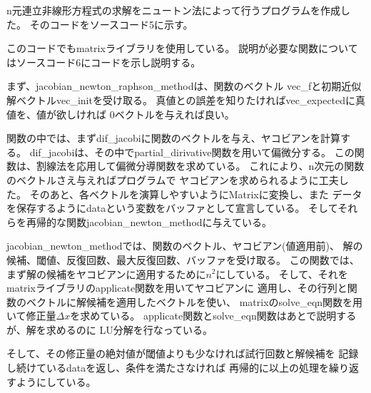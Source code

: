 \documentclass[uplatex, 11pt,a4j, titlepage]{jsarticle}
\begin{document}

\newpage



\subtitle{2019/*/*}


n元連立非線形方程式の求解をニュートン法によって行うプログラムを作成した。
そのコードをソースコード5に示す。

このコードでもmatrixライブラリを使用している。
説明が必要な関数についてはソースコード6にコードを示し説明する。

まず、jacobian\_newton\_raphson\_methodは、関数のベクトル
vec\_fと初期近似解ベクトルvec\_initを受け取る。
真値との誤差を知りたければvec\_expectedに真値を、値が欲しければ
0ベクトルを与えれば良い。

関数の中では、まずdif\_jacobiに関数のベクトルを与え、ヤコビアンを計算する。
dif\_jacobiは、その中でpartial\_dirivative関数を用いて偏微分する。
この関数は、割線法を応用して偏微分導関数を求めている。
これにより、n次元の関数のベクトルさえ与えればプログラムで
ヤコビアンを求められるように工夫した。
そのあと、各ベクトルを演算しやすいようにMatrixに変換し、また
データを保存するようにdataという変数をバッファとして宣言している。
そしてそれらを再帰的な関数jacobian\_newton\_methodに与えている。

jacobian\_newton\_methodでは、関数のベクトル、ヤコビアン(値適用前)、
解の候補、閾値、反復回数、最大反復回数、バッファを受け取る。
この関数では、まず解の候補をヤコビアンに適用するために$n^2$にしている。
そして、それをmatrixライブラリのapplicate関数を用いてヤコビアンに
適用し、その行列と関数のベクトルに解候補を適用したベクトルを使い、
matrixのsolve\_eqn関数を用いて修正量$\Delta x$を求めている。
applicate関数とsolve\_eqn関数はあとで説明するが、解を求めるのに
LU分解を行なっている。

そして、その修正量の絶対値が閾値よりも少なければ試行回数と解候補を
記録し続けているdataを返し、条件を満たさなければ
再帰的に以上の処理を繰り返すようにしている。




\ 
\end{document}

